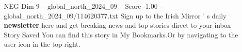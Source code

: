 \begin{textsample}{NEG Dim 9 – global\_north\_2024\_09 – Score -1.00 – global\_north\_2024\_09/114620377.txt}
Sign up to the Irish Mirror ' s daily \textbf{newsletter} here and get breaking news and top stories direct to your inbox Story Saved You can find this story in My Bookmarks.Or by navigating to the user icon in the top right.

\end{textsample}
